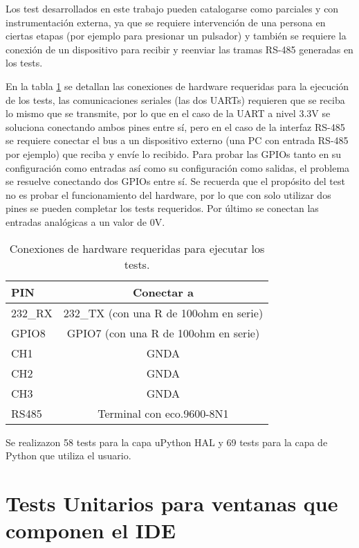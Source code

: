Los test desarrollados en este trabajo pueden catalogarse como parciales y con instrumentación externa, ya que se requiere intervención de una persona en ciertas etapas (por ejemplo para presionar un pulsador) y también se requiere la conexión de un dispositivo para recibir y reenviar las tramas RS-485 generadas en los tests.

En la tabla \ref{tab:hardreq} se detallan las conexiones de hardware requeridas para la ejecución de los tests, las comunicaciones seriales (las dos UARTs) requieren que se reciba lo mismo que se transmite, por lo que en el caso de la UART a nivel 3.3V se soluciona conectando ambos pines entre sí, pero en el caso de la interfaz RS-485 se requiere conectar el bus a un dispositivo externo (una PC con entrada RS-485 por ejemplo) que reciba y envíe lo recibido.
Para probar las GPIOs tanto en su configuración como entradas así como su configuración como salidas, el problema se resuelve conectando dos GPIOs entre sí. Se recuerda que el propósito del test no es probar el funcionamiento del hardware, por lo que con solo utilizar dos pines se pueden completar los tests requeridos. Por último se conectan las entradas analógicas a un valor de 0V.

\begin{table}[h]
	\centering
	\caption[Conexiones de hardware requeridas para ejecutar los tests]{Conexiones de hardware requeridas para ejecutar los tests.}
	\begin{tabular}{l c}    
		\toprule
		\textbf{PIN} 	 	& \textbf{Conectar a}   									\\
		\midrule
		232\_RX	 				& 232\_TX (con una R de 100ohm en serie)		\\	
		GPIO8	 					& GPIO7 (con una R de 100ohm en serie)		\\		
		CH1	 						& GNDA																		\\		
		CH2	 						& GNDA																		\\		
		CH3	 						& GNDA																		\\		
		RS485						& Terminal con eco.9600-8N1								\\
		\bottomrule
		\hline
	\end{tabular}
	\label{tab:hardreq}
\end{table}

Se realizazon 58 tests para la capa uPython HAL y 69 tests para la capa de Python que utiliza el usuario.

\section{Tests Unitarios para ventanas que componen el IDE}
\label{sec:testUnitariosIDE}

